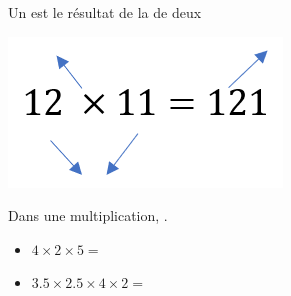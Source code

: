 \begin{mydef}
			Un \hspace*{2cm} est le résultat de la  de deux %
		
\end{mydef}
	
\begin{myex}
	\begin{center}
		\includegraphics*[scale=0.7]{img/produit2}
	\end{center}
\end{myex}

\begin{myprop}
	Dans une multiplication, .
\end{myprop}

\begin{myex}
	\begin{itemize}
		\item $4 \times 2 \times 5 = $%
		\item $\num{3.5} \times \num{2.5} \times 4 \times \num{2} = $%
	\end{itemize}
\end{myex}